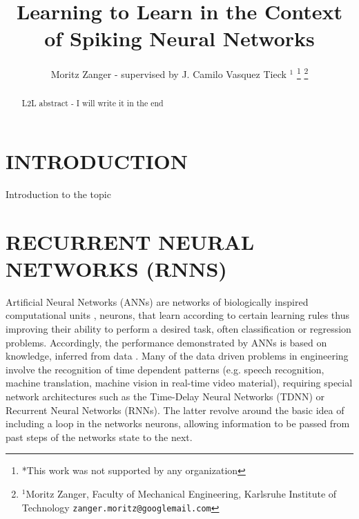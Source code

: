 \documentclass[letterpaper, 10 pt, conference]{ieeeconf}  %
\title{\LARGE \bf
Learning to Learn in the Context of Spiking Neural Networks
}
\author{Moritz Zanger - supervised by J. Camilo Vasquez Tieck $^{1}$ %
\thanks{*This work was not supported by any organization}%
\thanks{$^{1}$Moritz Zanger, Faculty of Mechanical Engineering, Karlsruhe Institute of Technology
        {\tt\small zanger.moritz@googlemail.com}}%
}
\begin{document}
\maketitle
\thispagestyle{empty}
\pagestyle{empty}


\begin{abstract}

L2L abstract - I will write it in the end

\end{abstract}


\section{INTRODUCTION}

Introduction to the topic

\section{RECURRENT NEURAL NETWORKS (RNNS)}
Artificial Neural Networks (ANNs) are networks of biologically inspired computational units , neurons, that learn 
according to certain learning rules thus improving their ability to perform a desired task, often classification or regression 
problems. Accordingly, the performance demonstrated by ANNs is based on knowledge, inferred from data \cite{schusterBidirectionalRecurrentNeural1997}.
Many of the data driven problems in engineering involve the recognition of time dependent patterns (e.g. speech
recognition, machine translation, machine vision in real-time video material), requiring special
network architectures such as the Time-Delay Neural Networks (TDNN) \cite{waibelPhonemeRecognitionUsing1989} or Recurrent Neural Networks (RNNs). 
The latter revolve around the basic idea of including a loop in the networks neurons, allowing information to be passed 
from past steps of the networks state to the next. 
\end{document}
